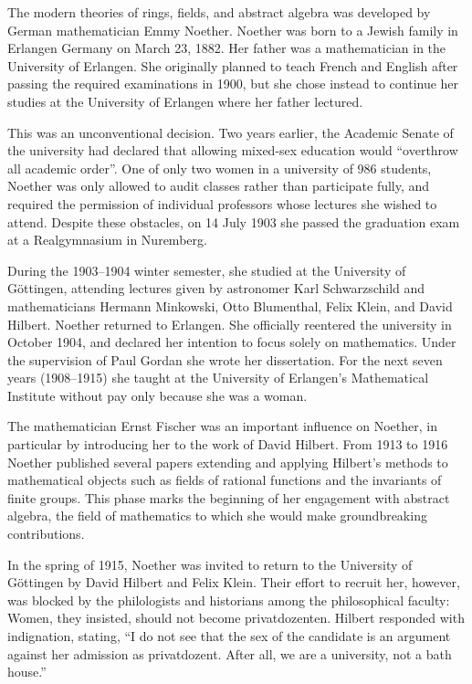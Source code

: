 \documentclass{article}
\begin{document}

The modern theories of rings, fields, and abstract algebra was developed by German mathematician Emmy Noether. Noether was born to a Jewish family in Erlangen Germany on March 23, 1882. Her father was a mathematician in the University of Erlangen. She originally planned to teach French and English after passing the required examinations in 1900, but she chose instead to continue her studies at the University of Erlangen where her father lectured.

This was an unconventional decision. Two years earlier, the Academic Senate of the university had declared that allowing mixed-sex education would ``overthrow all academic order''. One of only two women in a university of 986 students, Noether was only allowed to audit classes rather than participate fully, and required the permission of individual professors whose lectures she wished to attend. Despite these obstacles, on 14 July 1903 she passed the graduation exam at a Realgymnasium in Nuremberg.

During the 1903–1904 winter semester, she studied at the University of Göttingen, attending lectures given by astronomer Karl Schwarzschild and mathematicians Hermann Minkowski, Otto Blumenthal, Felix Klein, and David Hilbert. Noether returned to Erlangen. She officially reentered the university in October 1904, and declared her intention to focus solely on mathematics. Under the supervision of Paul Gordan she wrote her dissertation. For the next seven years (1908–1915) she taught at the University of Erlangen's Mathematical Institute without pay only because she was a woman.

The mathematician Ernst Fischer was an important influence on Noether, in particular by introducing her to the work of David Hilbert. From 1913 to 1916 Noether published several papers extending and applying Hilbert's methods to mathematical objects such as fields of rational functions and the invariants of finite groups. This phase marks the beginning of her engagement with abstract algebra, the field of mathematics to which she would make groundbreaking contributions.

In the spring of 1915, Noether was invited to return to the University of Göttingen by David Hilbert and Felix Klein. Their effort to recruit her, however, was blocked by the philologists and historians among the philosophical faculty: Women, they insisted, should not become privatdozenten. Hilbert responded with indignation, stating, ``I do not see that the sex of the candidate is an argument against her admission as privatdozent. After all, we are a university, not a bath house.''
\end{document}
